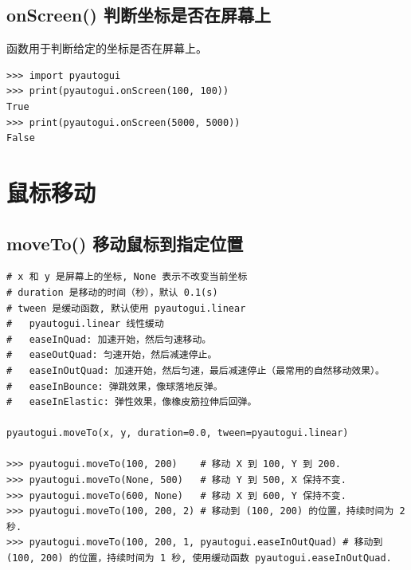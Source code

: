 \subsection{onScreen() 判断坐标是否在屏幕上}
 函数用于判断给定的坐标是否在屏幕上。
\begin{lstlisting}[style=demostyle,numbers=none]
>>> import pyautogui
>>> print(pyautogui.onScreen(100, 100))
True
>>> print(pyautogui.onScreen(5000, 5000))
False
\end{lstlisting}

\section{鼠标移动}
\subsection{moveTo() 移动鼠标到指定位置}
\begin{lstlisting}[style=demostyle,numbers=none]
# x 和 y 是屏幕上的坐标, None 表示不改变当前坐标
# duration 是移动的时间（秒），默认 0.1(s)
# tween 是缓动函数, 默认使用 pyautogui.linear
#   pyautogui.linear 线性缓动
#   easeInQuad: 加速开始，然后匀速移动。
#   easeOutQuad: 匀速开始，然后减速停止。
#   easeInOutQuad: 加速开始，然后匀速，最后减速停止（最常用的自然移动效果）。
#   easeInBounce: 弹跳效果，像球落地反弹。
#   easeInElastic: 弹性效果，像橡皮筋拉伸后回弹。

pyautogui.moveTo(x, y, duration=0.0, tween=pyautogui.linear)

>>> pyautogui.moveTo(100, 200)    # 移动 X 到 100, Y 到 200.
>>> pyautogui.moveTo(None, 500)   # 移动 Y 到 500, X 保持不变.
>>> pyautogui.moveTo(600, None)   # 移动 X 到 600, Y 保持不变.
>>> pyautogui.moveTo(100, 200, 2) # 移动到 (100, 200) 的位置，持续时间为 2 秒.
>>> pyautogui.moveTo(100, 200, 1, pyautogui.easeInOutQuad) # 移动到 (100, 200) 的位置，持续时间为 1 秒, 使用缓动函数 pyautogui.easeInOutQuad.
\end{lstlisting}

